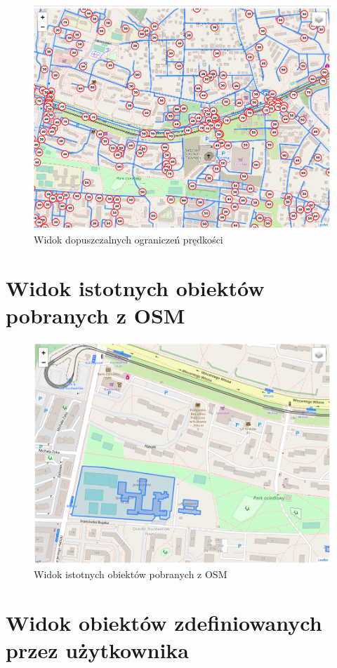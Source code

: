 \begin{figure}[h]
\caption{Widok dopuszczalnych ograniczeń prędkości}
\label{sec:speedLimitMap}
\centering
\includegraphics[width=1.03\textwidth]{speedLimit}
\end{figure}

\newpage
\section{Widok istotnych obiektów pobranych z OSM}
\label{sec:objects}

\begin{figure}[h]
\caption{Widok istotnych obiektów pobranych z OSM}
\label{sec:objectsMap}
\centering
\includegraphics[width=1.03\textwidth]{objects}
\end{figure}

\newpage
\section{Widok obiektów zdefiniowanych przez użytkownika}
\label{sec:customObjects}